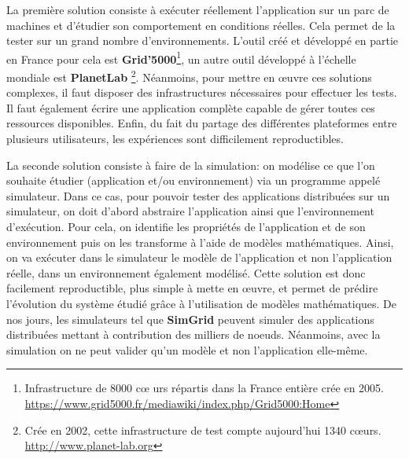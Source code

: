 La première solution consiste à exécuter réellement l'application sur un parc de
machines et d'étudier son comportement en conditions réelles. Cela permet de la
tester sur un grand nombre d'environnements. L'outil créé et développé en partie
en France pour cela est \textbf{Grid'5000}\footnote{Infrastructure de 8000 c\oe
  urs répartis dans la France entière crée en
  2005. \\ \url{https://www.grid5000.fr/mediawiki/index.php/Grid5000:Home}}\citep{GRID5000},
un autre outil développé à l'échelle mondiale est
\textbf{PlanetLab} \footnote{Crée en 2002, cette infrastructure de test compte
  aujourd'hui 1340 c\oe urs. \\ \url{http://www.planet-lab.org}}. Néanmoins,
pour mettre en \oe uvre ces solutions complexes, il faut disposer des
infrastructures nécessaires pour effectuer les tests. Il faut également écrire
une application complète capable de gérer toutes ces ressources
disponibles. Enfin, du fait du partage des différentes plateformes entre
plusieurs utilisateurs, les expériences sont difficilement reproductibles.

La seconde solution consiste à faire de la simulation: on modélise ce que l'on
souhaite étudier (application et/ou environnement) via un programme appelé
simulateur. Dans ce cas, pour pouvoir tester des applications distribuées sur un
simulateur, on doit d'abord abstraire l'application ainsi que l'environnement
d'exécution. Pour cela, on identifie les propriétés de l'application et de son
environnement puis on les transforme à l'aide de modèles mathématiques. Ainsi,
on va exécuter dans le simulateur le modèle de l'application et non
l'application réelle, dans un environnement également modélisé. Cette solution
est donc facilement reproductible, plus simple à mette en \oe uvre, et permet de
prédire l'évolution du système étudié grâce à l'utilisation de modèles
mathématiques. De nos jours, les simulateurs tel que
\textbf{SimGrid}\citep{CASANOVA:SimGrid, MARTIN:SimGrid} peuvent simuler des
applications distribuées mettant à contribution des milliers de
noeuds. Néanmoins, avec la simulation on ne peut valider qu'un modèle et non
l'application elle-même.

